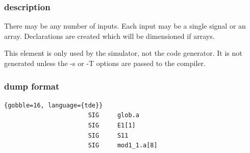             \subsubsection{description}

                There may be any number of inputs. Each input
                may be a single signal or an array. Declarations
                are created which will be dimensioned if arrays.
                
                This element is only used by the simulator, not the code
                generator. It is not generated unless the -s or -T options
                are passed to the compiler.

            \subsubsection{dump format}
            
                \begin{lstlisting}{gobble=16, language={tde}}
                       SIG     glob.a
                       SIG     E1[1]
                       SIG     S11
                       SIG     mod1_1.a[8]
                \end{lstlisting}



